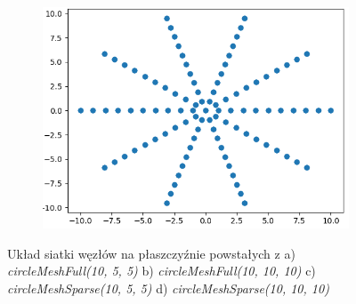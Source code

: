 \begin{figure}
\begin{subfigure}{.5\textwidth}
  \caption{}
  \label{fig:sfig3}
\end{subfigure}%
\begin{subfigure}{.5\textwidth}
  \centering
  \includegraphics[width=.8\linewidth]{Zdjecia/5/siatka4}
  \caption{}
  \label{fig:sfig4}
\end{subfigure} 
\caption{Układ siatki węzłów na płaszczyźnie powstałych z a) \textit{circleMeshFull(10, 5, 5)} b) \textit{circleMeshFull(10, 10, 10)} c) \textit{circleMeshSparse(10, 5, 5)} d) \textit{circleMeshSparse(10, 10, 10)}}
\label{fig:siatka}
\end{figure}


